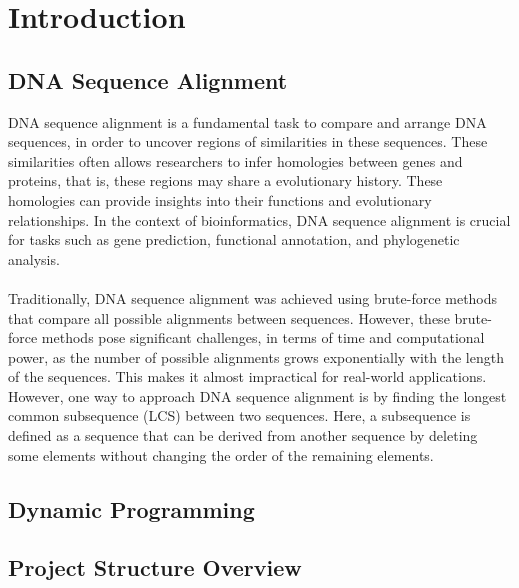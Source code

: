 \section{Introduction}

\subsection{DNA Sequence Alignment}
DNA sequence alignment is a fundamental task to compare and arrange DNA sequences, in order to 
uncover regions of similarities in these sequences. These similarities often allows researchers to 
infer homologies between genes and proteins, that is, these regions may share a evolutionary history. 
These homologies can provide insights into their functions and evolutionary relationships. 
In the context of bioinformatics, DNA sequence alignment is crucial for tasks such as
gene prediction, functional annotation, and phylogenetic analysis.
\\
\\
Traditionally, DNA sequence alignment was achieved using brute-force methods that compare all 
possible alignments between sequences. However, these brute-force methods pose
significant challenges, in terms of time and computational power, as the number of possible alignments grows 
exponentially with the length of the sequences. This makes it almost impractical for real-world applications.
However, one way to approach DNA sequence alignment is by finding the longest common subsequence (LCS) between
two sequences. Here, a subsequence is defined as a sequence that can be derived from another sequence by 
deleting some elements without changing the order of the remaining elements.

\subsection{Dynamic Programming}



\subsection{Project Structure Overview}
